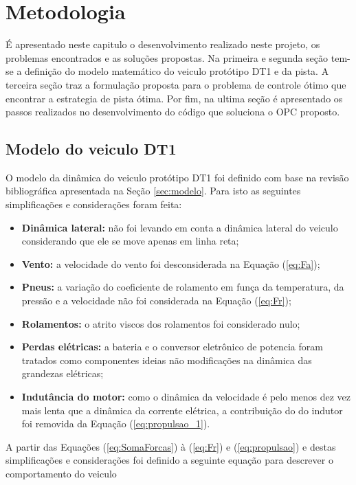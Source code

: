 \chapter{Metodologia}
\label{chap:metodologia}
\thispagestyle{empty}

É apresentado neste capitulo o desenvolvimento realizado neste projeto, os problemas encontrados e as soluções propostas.
Na primeira e segunda seção tem-se a definição do modelo matemático do veiculo protótipo DT1 e da pista. A terceira seção traz a formulação proposta para o problema de controle ótimo que encontrar
a estrategia de pista ótima. Por fim, na ultima seção é apresentado os passos realizados no desenvolvimento do código que soluciona o OPC proposto. 

\section{Modelo do veiculo DT1} 

O modelo da dinâmica do veiculo protótipo DT1 foi definido com base na revisão bibliográfica apresentada na Seção \ref{sec:modelo}. 
Para isto as seguintes simplificações e considerações foram feita:

\begin{itemize}
    \item \textbf{Dinâmica lateral:} não foi levando em conta a dinâmica lateral do veiculo considerando que ele se move apenas em linha reta; 
    \item \textbf{Vento:} a velocidade do vento foi desconsiderada na Equação (\ref{eq:Fa});
    \item \textbf{Pneus:} a variação do coeficiente de rolamento em funça da temperatura, da pressão e a velocidade não foi considerada na Equação (\ref{eq:Fr});
    \item \textbf{Rolamentos:} o atrito viscos dos rolamentos foi considerado nulo;
    \item \textbf{Perdas elétricas:} a bateria e o conversor eletrônico de potencia foram tratados como componentes ideias não modificações na dinâmica das grandezas elétricas;
    \item \textbf{Indutância do motor:} como o dinâmica da velocidade é pelo menos dez vez mais lenta que a dinâmica da corrente elétrica, a contribuição do do indutor foi removida da Equação (\ref{eq:propulsao_1}).  
\end{itemize}

A partir das Equações (\ref{eq:SomaForcas}) à (\ref{eq:Fr}) e (\ref{eq:propulsao}) e destas simplificações e considerações foi definido a 
seguinte equação para descrever o comportamento do veiculo

